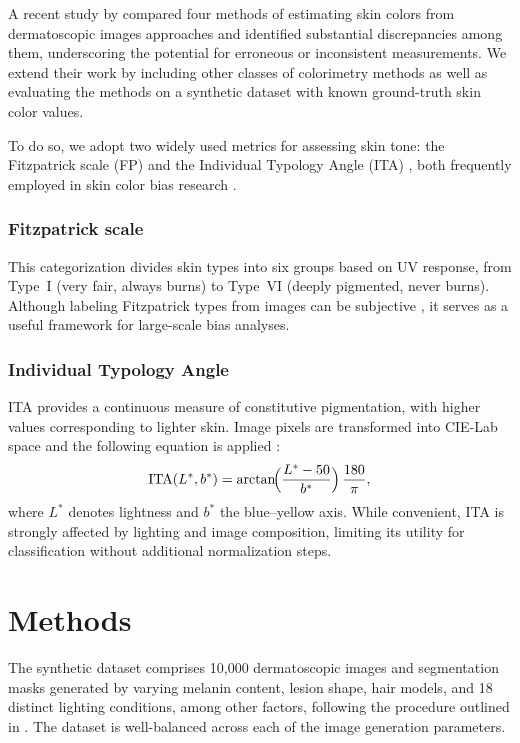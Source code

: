 \documentclass[a4paper,conference]{IEEEtran}
\begin{document}
A recent study by \citet{kalbRevisitingSkinTone2023} compared four methods of estimating skin colors from dermatoscopic images approaches and identified substantial discrepancies among them, underscoring the potential for erroneous or inconsistent measurements. We extend their work by including other classes of colorimetry methods as well as evaluating the methods on a synthetic dataset with known ground-truth skin color values.

To do so, we adopt two widely used metrics for assessing skin tone: the Fitzpatrick scale (FP) \cite{fitzpatrickValidityPracticalitySunReactive1988} and the Individual Typology Angle (ITA) \cite{farkasInternationalAnthropometricStudy2005}, both frequently employed in skin color bias research \cite{grohEvaluatingDeepNeural2021, kinyanjuiEstimatingSkinTone2019}.

\subsubsection{Fitzpatrick scale}  This categorization divides skin types into six groups based on UV response, from Type~I (very fair, always burns) to Type~VI (deeply pigmented, never burns). Although labeling Fitzpatrick types from images can be subjective \cite{grohEvaluatingDeepNeural2021}, it serves as a useful framework for large-scale bias analyses.

\subsubsection{Individual Typology Angle} ITA provides a continuous measure of constitutive pigmentation, with higher values corresponding to lighter skin. Image pixels are transformed into CIE-Lab space and the following equation is applied \cite{kinyanjuiEstimatingSkinTone2019}:
\begin{equation}\label{eq:ita}
  \mathrm{ITA}(L^*, b^*) = \arctan\!\Bigl(\frac{L^* - 50}{b^*}\Bigr)\,\frac{180}{\pi},
\end{equation}
where \(L^*\) denotes lightness and \(b^*\) the blue--yellow axis. While convenient, ITA is strongly affected by lighting and image composition, limiting its utility for classification without additional normalization steps.

\section{Methods}

The synthetic dataset comprises 10,000 dermatoscopic images and segmentation masks generated by varying melanin content, lesion shape, hair models, and 18 distinct lighting conditions, among other factors, following the procedure outlined in \cite{ssynth}. The dataset is well-balanced across each of the image generation parameters.
\end{document}
